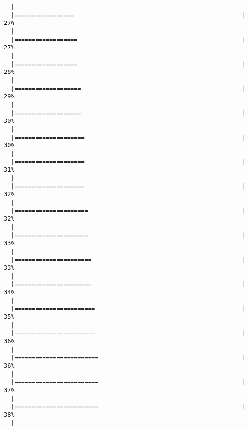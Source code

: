 \begin{knitrout}
\begin{kframe}
\begin{verbatim}
  |                                                                       
  |=================                                                |  27%
  |                                                                       
  |==================                                               |  27%
  |                                                                       
  |==================                                               |  28%
  |                                                                       
  |===================                                              |  29%
  |                                                                       
  |===================                                              |  30%
  |                                                                       
  |====================                                             |  30%
  |                                                                       
  |====================                                             |  31%
  |                                                                       
  |====================                                             |  32%
  |                                                                       
  |=====================                                            |  32%
  |                                                                       
  |=====================                                            |  33%
  |                                                                       
  |======================                                           |  33%
  |                                                                       
  |======================                                           |  34%
  |                                                                       
  |=======================                                          |  35%
  |                                                                       
  |=======================                                          |  36%
  |                                                                       
  |========================                                         |  36%
  |                                                                       
  |========================                                         |  37%
  |                                                                       
  |========================                                         |  38%
  |                                                                       

\end{verbatim}
\end{kframe}
\end{knitrout}
